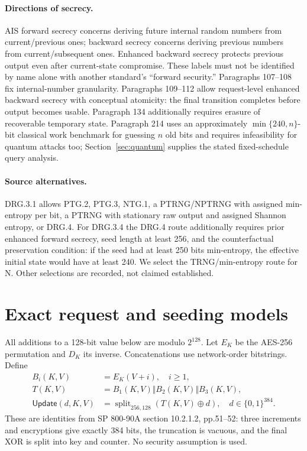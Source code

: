 \documentclass[11 pt,a 4 paper]{article}
\newcommand{\bits}{\{0,1\}}
\newcommand{\Upd}{\mathsf{Update}}
\begin{document}
\paragraph{Directions of secrecy.} AIS forward secrecy concerns deriving future internal random numbers from current/previous ones; backward secrecy concerns deriving previous numbers from current/subsequent ones. Enhanced backward secrecy protects previous output even after current-state compromise. These labels must not be identified by name alone with another standard's ``forward security.'' Paragraphs 107--108 fix internal-number granularity. Paragraphs 109--112 allow request-level enhanced backward secrecy with conceptual atomicity: the final transition completes before output becomes usable. Paragraph 134 additionally requires erasure of recoverable temporary state. Paragraph 214 uses an approximately $\min\{240,n\}$-bit classical work benchmark for guessing $ n $ old bits and requires infeasibility for quantum attacks too; Section~\ref{sec:quantum} supplies the stated fixed-schedule query analysis.

\paragraph{Source alternatives.} DRG.3.1 allows PTG.2, PTG.3, NTG.1, a PTRNG/NPTRNG with assigned min-entropy per bit, a PTRNG with stationary raw output and assigned Shannon entropy, or DRG.4. For DRG.3.4 the DRG.4 route additionally requires prior enhanced forward secrecy, seed length at least 256, and the counterfactual preservation condition: if the seed had at least 250 bits min-entropy, the effective initial state would have at least 240. We select the TRNG/min-entropy route for N. Other selections are recorded, not claimed established.

\section{Exact request and seeding models}
All additions to a 128-bit value below are modulo $2^{128}$. Let $ E_K $ be the AES-256 permutation and $ D_K $ its inverse. Concatenations use network-order bitstrings. Define
\begin{align}
 B_i(K,V)&=E_K(V+i),\quad i\geq 1,\label{eq:b}\\
 T(K,V)&=B_1(K,V)\Vert B_2(K,V)\Vert B_3(K,V),\label{eq:t}\\
 \Upd(d,K,V)&=\operatorname{split}_{256,128}(T(K,V)\oplus d),\quad d\in\bits^{384}.\label{eq:update}
\end{align}
These are identities from SP 800-90A section 10.2.1.2, pp.51--52: three increments and encryptions give exactly 384 bits, the truncation is vacuous, and the final XOR is split into key and counter. No security assumption is used.
\end{document}
